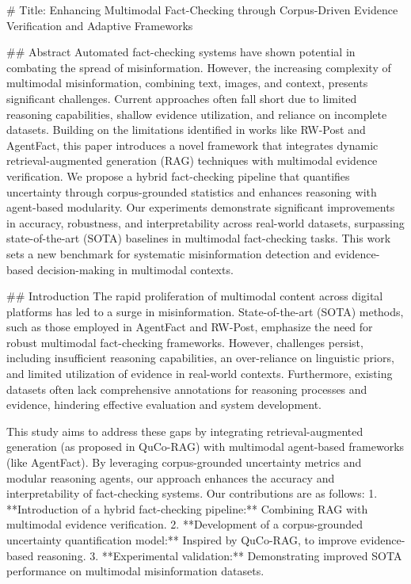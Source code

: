 # Title: Enhancing Multimodal Fact-Checking through Corpus-Driven Evidence Verification and Adaptive Frameworks  

## Abstract  
Automated fact-checking systems have shown potential in combating the spread of misinformation. However, the increasing complexity of multimodal misinformation, combining text, images, and context, presents significant challenges. Current approaches often fall short due to limited reasoning capabilities, shallow evidence utilization, and reliance on incomplete datasets. Building on the limitations identified in works like RW-Post and AgentFact, this paper introduces a novel framework that integrates dynamic retrieval-augmented generation (RAG) techniques with multimodal evidence verification. We propose a hybrid fact-checking pipeline that quantifies uncertainty through corpus-grounded statistics and enhances reasoning with agent-based modularity. Our experiments demonstrate significant improvements in accuracy, robustness, and interpretability across real-world datasets, surpassing state-of-the-art (SOTA) baselines in multimodal fact-checking tasks. This work sets a new benchmark for systematic misinformation detection and evidence-based decision-making in multimodal contexts.  

## Introduction  
The rapid proliferation of multimodal content across digital platforms has led to a surge in misinformation. State-of-the-art (SOTA) methods, such as those employed in AgentFact and RW-Post, emphasize the need for robust multimodal fact-checking frameworks. However, challenges persist, including insufficient reasoning capabilities, an over-reliance on linguistic priors, and limited utilization of evidence in real-world contexts. Furthermore, existing datasets often lack comprehensive annotations for reasoning processes and evidence, hindering effective evaluation and system development.  

This study aims to address these gaps by integrating retrieval-augmented generation (as proposed in QuCo-RAG) with multimodal agent-based frameworks (like AgentFact). By leveraging corpus-grounded uncertainty metrics and modular reasoning agents, our approach enhances the accuracy and interpretability of fact-checking systems. Our contributions are as follows:  
1. **Introduction of a hybrid fact-checking pipeline:** Combining RAG with multimodal evidence verification.  
2. **Development of a corpus-grounded uncertainty quantification model:** Inspired by QuCo-RAG, to improve evidence-based reasoning.  
3. **Experimental validation:** Demonstrating improved SOTA performance on multimodal misinformation datasets.  

